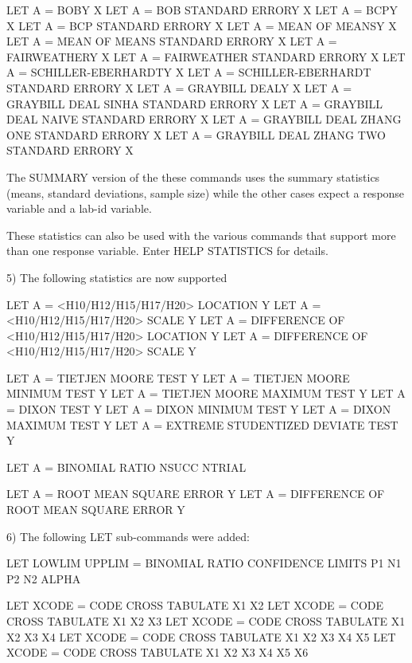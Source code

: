 {                  LET A = BOBY X
                  LET A = BOB STANDARD ERRORY X
                  LET A = BCPY X
                  LET A = BCP STANDARD ERRORY X
                  LET A = MEAN OF MEANSY X
                  LET A = MEAN OF MEANS STANDARD ERRORY X
                  LET A = FAIRWEATHERY X
                  LET A = FAIRWEATHER STANDARD ERRORY X
                  LET A = SCHILLER-EBERHARDTY X
                  LET A = SCHILLER-EBERHARDT STANDARD ERRORY X
                  LET A = GRAYBILL DEALY X
                  LET A = GRAYBILL DEAL SINHA STANDARD ERRORY X
                  LET A = GRAYBILL DEAL NAIVE STANDARD ERRORY X
                  LET A = GRAYBILL DEAL ZHANG ONE STANDARD ERRORY X
                  LET A = GRAYBILL DEAL ZHANG TWO STANDARD ERRORY X

        The SUMMARY version of the these commands uses the summary
        statistics (means, standard deviations, sample size) while
        the other cases expect a response variable and a lab-id variable.

        These statistics can also be used with the various commands that
        support more than one response variable.  Enter HELP STATISTICS
        for details.

 5) The following statistics are now supported

        LET A = <H10/H12/H15/H17/H20> LOCATION Y
        LET A = <H10/H12/H15/H17/H20> SCALE Y
        LET A = DIFFERENCE OF <H10/H12/H15/H17/H20> LOCATION Y
        LET A = DIFFERENCE OF <H10/H12/H15/H17/H20> SCALE Y

        LET A = TIETJEN MOORE TEST Y
        LET A = TIETJEN MOORE MINIMUM TEST Y
        LET A = TIETJEN MOORE MAXIMUM TEST Y
        LET A = DIXON TEST Y
        LET A = DIXON MINIMUM TEST Y
        LET A = DIXON MAXIMUM TEST Y
        LET A = EXTREME STUDENTIZED DEVIATE TEST Y

        LET A = BINOMIAL RATIO NSUCC NTRIAL

        LET A = ROOT MEAN SQUARE ERROR Y
        LET A = DIFFERENCE OF ROOT MEAN SQUARE ERROR Y

 6) The following LET sub-commands were added:

        LET LOWLIM UPPLIM = BINOMIAL RATIO CONFIDENCE LIMITS 
                            P1 N1 P2 N2 ALPHA

        LET XCODE = CODE CROSS TABULATE X1 X2
        LET XCODE = CODE CROSS TABULATE X1 X2 X3
        LET XCODE = CODE CROSS TABULATE X1 X2 X3 X4
        LET XCODE = CODE CROSS TABULATE X1 X2 X3 X4 X5
        LET XCODE = CODE CROSS TABULATE X1 X2 X3 X4 X5 X6

}
